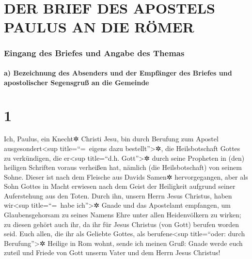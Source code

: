 \hypertarget{der-brief-des-apostels-paulus-an-die-ruxf6mer}{%
\section{DER BRIEF DES APOSTELS PAULUS AN DIE
RÖMER}\label{der-brief-des-apostels-paulus-an-die-ruxf6mer}}

\hypertarget{eingang-des-briefes-und-angabe-des-themas}{%
\subsubsection{Eingang des Briefes und Angabe des
Themas}\label{eingang-des-briefes-und-angabe-des-themas}}

\hypertarget{a-bezeichnung-des-absenders-und-der-empfuxe4nger-des-briefes-und-apostolischer-segensgruuxdf-an-die-gemeinde}{%
\paragraph{a) Bezeichnung des Absenders und der Empfänger des Briefes
und apostolischer Segensgruß an die
Gemeinde}\label{a-bezeichnung-des-absenders-und-der-empfuxe4nger-des-briefes-und-apostolischer-segensgruuxdf-an-die-gemeinde}}

\hypertarget{section}{%
\section{1}\label{section}}

 Ich, Paulus, ein Knecht✲ Christi Jesu, bin durch Berufung
zum Apostel ausgesondert\textless sup title=``=~eigens dazu
bestellt''\textgreater✲, die Heilsbotschaft Gottes zu verkündigen,
 die er\textless sup title=``d.h. Gott''\textgreater✲
durch seine Propheten in (den) heiligen Schriften voraus verheißen hat,
 nämlich (die Heilsbotschaft) von seinem Sohne. Dieser ist
nach dem Fleische aus Davids Samen✲ hervorgegangen,  aber
als Sohn Gottes in Macht erwiesen nach dem Geist der Heiligkeit aufgrund
seiner Auferstehung aus den Toten. Durch ihn, unsern Herrn Jesus
Christus,  haben wir\textless sup title=``=~habe
ich''\textgreater✲ Gnade und das Apostelamt empfangen, um
Glaubensgehorsam zu seines Namens Ehre unter allen Heidenvölkern zu
wirken;  zu diesen gehört auch ihr, da ihr für Jesus
Christus (von Gott) berufen worden seid.  Euch allen, die
ihr als Geliebte Gottes, als berufene\textless sup title=``oder: durch
Berufung''\textgreater✲ Heilige in Rom wohnt, sende ich meinen Gruß:
Gnade werde euch zuteil und Friede von Gott unserm Vater und dem Herrn
Jesus Christus!

